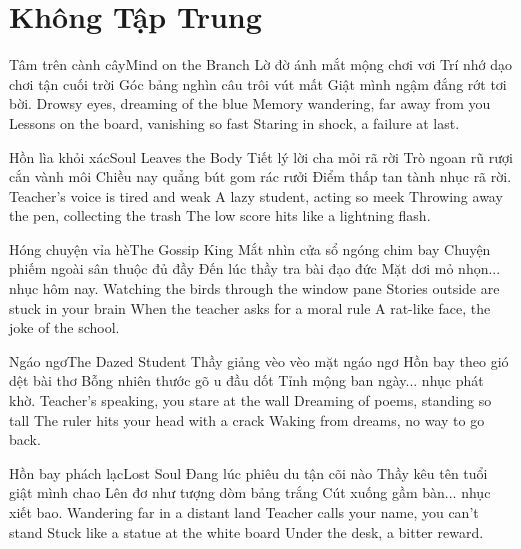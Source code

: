 \chapter{Không Tập Trung}

\begin{tutuyetbox}{Tâm trên cành cây}{Mind on the Branch}
Lờ đờ ánh mắt mộng chơi vơi
Trí nhớ dạo chơi tận cuối trời
Góc bảng nghìn câu trôi vút mất
Giật mình ngậm đắng rớt tơi bời.
\tcblower
Drowsy eyes, dreaming of the blue 
Memory wandering, far away from you 
Lessons on the board, vanishing so fast 
Staring in shock, a failure at last.
\end{tutuyetbox}

\begin{tutuyetbox}{Hồn lìa khỏi xác}{Soul Leaves the Body}
Tiết lý lời cha mỏi rã rời
Trò ngoan rũ rượi cắn vành môi
Chiều nay quẳng bút gom rác rưởi
Điểm thấp tan tành nhục rã rời.
\tcblower
Teacher's voice is tired and weak 
A lazy student, acting so meek 
Throwing away the pen, collecting the trash 
The low score hits like a lightning flash.
\end{tutuyetbox}

\begin{tutuyetbox}{Hóng chuyện vỉa hè}{The Gossip King}
Mắt nhìn cửa sổ ngóng chim bay
Chuyện phiếm ngoài sân thuộc đủ đầy
Đến lúc thầy tra bài đạo đức
Mặt dơi mỏ nhọn... nhục hôm nay.
\tcblower
Watching the birds through the window pane
Stories outside are stuck in your brain
When the teacher asks for a moral rule
A rat-like face, the joke of the school.
\end{tutuyetbox}

\begin{tutuyetbox}{Ngáo ngơ}{The Dazed Student}
Thầy giảng vèo vèo mặt ngáo ngơ
Hồn bay theo gió dệt bài thơ
Bỗng nhiên thước gõ u đầu dốt
Tỉnh mộng ban ngày... nhục phát khờ.
\tcblower
Teacher's speaking, you stare at the wall
Dreaming of poems, standing so tall
The ruler hits your head with a crack
Waking from dreams, no way to go back.
\end{tutuyetbox}

\begin{tutuyetbox}{Hồn bay phách lạc}{Lost Soul}
Đang lúc phiêu du tận cõi nào
Thầy kêu tên tuổi giật mình chao
Lên đơ như tượng dòm bảng trắng
Cút xuống gầm bàn... nhục xiết bao.
\tcblower
Wandering far in a distant land
Teacher calls your name, you can't stand
Stuck like a statue at the white board
Under the desk, a bitter reward.
\end{tutuyetbox}

